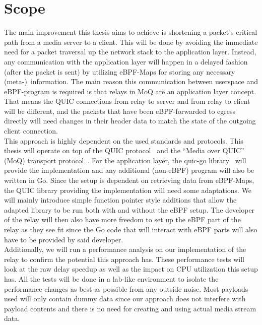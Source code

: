 \section{Scope}\label{sec:scope}

The main improvement this thesis aims to achieve is shortening a packet's critical path from a media server to a client.
This will be done by avoiding the immediate need for a packet traversal up the network stack to the application layer.
Instead, any communication with the application layer will happen in a delayed fashion (after the packet is sent) by utilizing 
eBPF-Maps for storing any necessary (meta-)~information.
The main reason this communication between userspace and eBPF-program is required is that relays in MoQ are an application layer concept.
That means the QUIC connections from relay to server and from relay to client will be different, and the packets that have been eBPF-forwarded to egress directly will need changes in their header data to match the state of the outgoing client connection.  
\\
This approach is highly dependent on the used standards and protocols.
This thesis will operate on top of the QUIC protocol~\parencite{rfc-9000} and the ``Media over QUIC'' (MoQ) 
transport protocol~\parencite{draft-moqtransport}.
For the application layer, the quic-go library~\parencite{quic-go-repo} will provide the implementation and 
any additional (non-eBPF) program will also be written in Go.
Since the setup is dependent on retrieving data from eBPF-Maps, the QUIC library providing the implementation 
will need some adaptations.
We will mainly introduce simple function pointer style additions that allow the adapted library to be run 
both with and without the eBPF setup.
The developer of the relay will then also have more freedom to set up the eBPF part of the relay as they see fit
since the Go code that will interact with eBPF parts will also have to be provided by said developer.
\\
Additionally, we will run a performance analysis on our implementation of the relay to confirm the potential this 
approach has.
These performance tests will look at the raw delay speedup as well as the impact on CPU utilization this 
setup has.
All the tests will be done in a lab-like environment to isolate the performance changes as best as possible
from any outside noise.
Most payloads used will only contain dummy data since our approach does not interfere with payload contents 
and there is no need for creating and using actual media stream data.
\\
